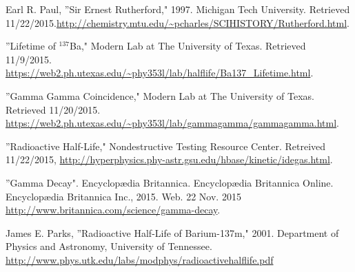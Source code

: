 \documentclass[11pt,letterpaper,onecolumn]{article}
\begin{document}
\begin{thebibliography}{9}

Earl R. Paul, ''Sir Ernest Rutherford," 1997. Michigan Tech University. Retrieved 11/22/2015.\url{http://chemistry.mtu.edu/~pcharles/SCIHISTORY/Rutherford.html}.

''Lifetime of $^137$Ba," Modern Lab at The University of Texas. Retrieved 11/9/2015. \url{https://web2.ph.utexas.edu/~phy353l/lab/halflife/Ba137_Lifetime.html}.

''Gamma Gamma Coincidence," Modern Lab at The University of Texas. Retrieved 11/20/2015.
\url{https://web2.ph.utexas.edu/~phy353l/lab/gammagamma/gammagamma.html}.

''Radioactive Half-Life," Nondestructive Testing Resource Center. Retreived 11/22/2015, \url{http://hyperphysics.phy-astr.gsu.edu/hbase/kinetic/idegas.html}.

''Gamma Decay". Encyclopædia Britannica. Encyclopædia Britannica Online.
Encyclopædia Britannica Inc., 2015. Web. 22 Nov. 2015
\url{http://www.britannica.com/science/gamma-decay}.

James E. Parks, ''Radioactive Half-Life of Barium-137m," 2001. Department of Physics and Astronomy, University of Tennessee. \url{http://www.phys.utk.edu/labs/modphys/radioactivehalflife.pdf}  


\end{thebibliography}

\end{document}
